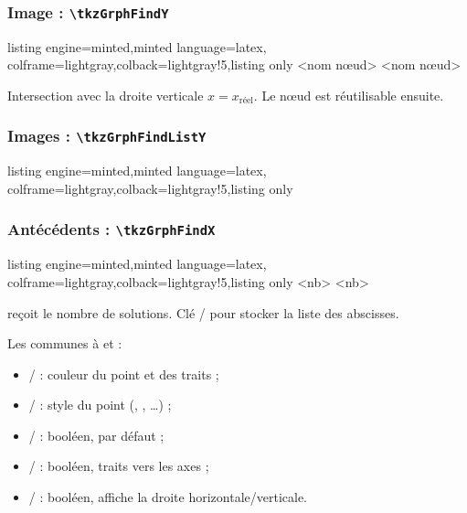 \documentclass[11pt,a4paper]{ltxdoc}
\begin{document}
\subsubsection{Image : \texttt{\textbackslash tkzGrphFindY}}

\begin{tcblisting}{listing engine=minted,minted language=latex,
  colframe=lightgray,colback=lightgray!5,listing only}
<nom nœud>
<nom nœud>
\end{tcblisting}

Intersection avec la droite verticale $x = x_{\text{réel}}$. Le nœud  est réutilisable ensuite.

\subsubsection{Images : \texttt{\textbackslash tkzGrphFindListY}}

\begin{tcblisting}{listing engine=minted,minted language=latex,
  colframe=lightgray,colback=lightgray!5,listing only}
\end{tcblisting}

\subsubsection{Antécédents : \texttt{\textbackslash tkzGrphFindX}}

\begin{tcblisting}{listing engine=minted,minted language=latex,
  colframe=lightgray,colback=lightgray!5,listing only}
<nb>
<nb>
\end{tcblisting}

 reçoit le nombre de solutions. Clé / pour stocker la liste des abscisses.

\smallskip

Les \MontreCode{[clés]} communes à  et  :

\begin{itemize}
	\item {} /  : couleur du point et des traits ;
	\item {} /  : style du point (, , \ldots) ;
	\item {} /  : booléen,  par défaut ;
	\item {} /  : booléen, traits vers les axes ;
	\item {} /  : booléen, affiche la droite horizontale/verticale.
\end{itemize}
\end{document}

